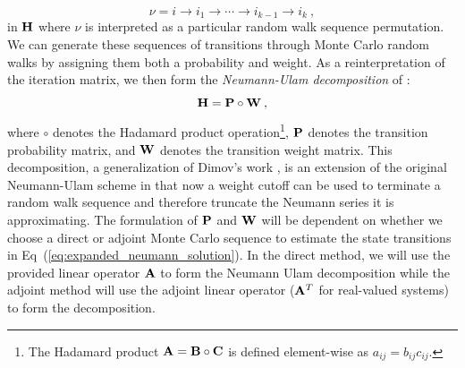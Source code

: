\begin{equation}
 \nu = i \rightarrow i_1 \rightarrow \cdots \rightarrow i_{k-1}
 \rightarrow i_{k}\:,
  \label{eq:mc_walk_permutation}
\end{equation}
in $\mathbf{H}$ where $\nu$ is interpreted as a particular random walk
sequence permutation. We can generate these sequences of transitions
through Monte Carlo random walks by assigning them both a probability
and weight. As a reinterpretation of the iteration matrix, we then
form the \textit{Neumann-Ulam decomposition} of :
\begin{equation}
  \mathbf{H} = \mathbf{P} \circ \mathbf{W}\:,
  \label{eq:neumann_ulam_decomposition}
\end{equation}
where $\circ$ denotes the Hadamard product operation\footnote{The
  Hadamard product $\mathbf{A} = \mathbf{B} \circ \mathbf{C}$ is defined
  element-wise as $a_{ij} = b_{ij} c_{ij}$.}, $\mathbf{P}$ denotes the
transition probability matrix, and $\mathbf{W}$ denotes the transition
weight matrix. This decomposition, a generalization of Dimov's work
\cite{dimov_new_1998}, is an extension of the original Neumann-Ulam
scheme in that now a weight cutoff can be used to terminate a random
walk sequence and therefore truncate the Neumann series it is
approximating. The formulation of $\mathbf{P}$ and $\mathbf{W}$ will be
dependent on whether we choose a direct or adjoint Monte Carlo
sequence to estimate the state transitions in
Eq~(\ref{eq:expanded_neumann_solution}). In the direct method, we will
use the provided linear operator $\mathbf{A}$ to form the Neumann Ulam
decomposition while the adjoint method will use the adjoint linear
operator ($\mathbf{A}^T$ for real-valued systems) to form the
decomposition.

